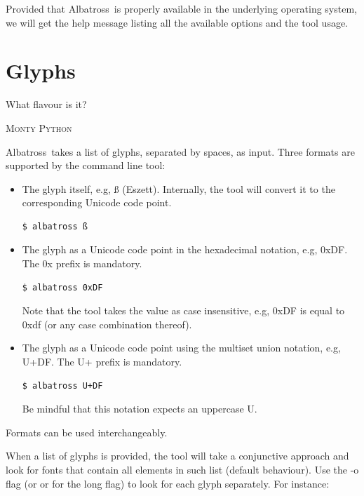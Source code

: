 \documentclass[12pt,article,a4paper,oneside]{memoir}
\newcommand{\albatross}{Albatross}
\newcommand{\glyph}[1]{{\ttfamily#1}}
\newcommand{\hex}[1]{{\ttfamily0x#1}}
\newcommand{\uno}[1]{{\ttfamily U+#1}}
\newcommand{\shortopt}[1]{{\ttfamily-#1}}
\newcommand{\longopt}[1]{{\ttfamily{-}{-}#1}}
\begin{document}
\bigskip

Provided that \albatross\ is properly available in the underlying operating
system, we will get the help message listing all the available options and the
tool usage.

\section{Glyphs}
\label{sec:glyphs}

\epigraph{What flavour is it?}{\textsc{Monty Python}}

\albatross\ takes a list of glyphs, separated by spaces, as input. Three formats
are supported by the command line tool:

\begin{itemize}[label={--}]
\item The glyph itself, e.g, \glyph{ß} (Eszett). Internally, the tool will
convert it to the corresponding Unicode code point.

\begin{Verbatim}[frame=single, fontsize=\small, framesep=3.5mm]
$ albatross ß
\end{Verbatim}

\item The glyph as a Unicode code point in the hexadecimal notation, e.g,
\hex{DF}. The \hex{} prefix is mandatory.

\begin{Verbatim}[frame=single, fontsize=\small, framesep=3.5mm]
$ albatross 0xDF
\end{Verbatim}

Note that the tool takes the value as case insensitive, e.g, \hex{DF} is equal
to \hex{df} (or any case combination thereof).

\item The glyph as a Unicode code point using the multiset union notation, e.g,
\uno{DF}. The \uno{} prefix is mandatory.

\begin{Verbatim}[frame=single, fontsize=\small, framesep=3.5mm]
$ albatross U+DF
\end{Verbatim}

Be mindful that this notation expects an uppercase \glyph{U}.
\end{itemize}

Formats can be used interchangeably.

When a list of glyphs is provided, the tool will take a conjunctive approach and
look for fonts that contain all elements in such list (default behaviour). Use
the \shortopt{o} flag (or \longopt{or} for the long flag) to look for each glyph
separately. For instance:
\end{document}
